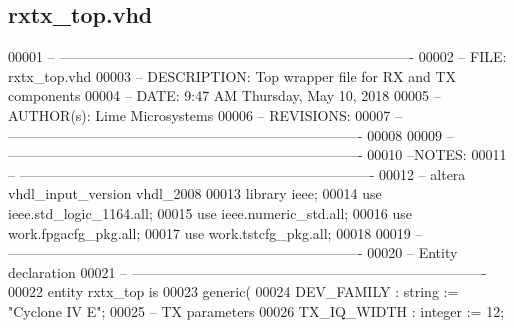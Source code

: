 \subsection{rxtx\+\_\+top.\+vhd}
\label{rxtx__top_8vhd_source}

\begin{DoxyCode}
00001 \textcolor{keyword}{-- ----------------------------------------------------------------------------}
00002 \textcolor{keyword}{-- FILE:          rxtx\_top.vhd}
00003 \textcolor{keyword}{-- DESCRIPTION:   Top wrapper file for RX and TX components}
00004 \textcolor{keyword}{-- DATE:          9:47 AM Thursday, May 10, 2018}
00005 \textcolor{keyword}{-- AUTHOR(s):     Lime Microsystems}
00006 \textcolor{keyword}{-- REVISIONS:}
00007 \textcolor{keyword}{-- ----------------------------------------------------------------------------}
00008 
00009 \textcolor{keyword}{-- ----------------------------------------------------------------------------}
00010 \textcolor{keyword}{--NOTES:}
00011 \textcolor{keyword}{-- ----------------------------------------------------------------------------}
00012 \textcolor{keyword}{-- altera vhdl\_input\_version vhdl\_2008}
00013 \textcolor{vhdlkeyword}{library }\textcolor{keywordflow}{ieee};
00014 \textcolor{vhdlkeyword}{use }ieee.std\_logic\_1164.\textcolor{keywordflow}{all};
00015 \textcolor{vhdlkeyword}{use }ieee.numeric\_std.\textcolor{keywordflow}{all};
00016 \textcolor{vhdlkeyword}{use }work.fpgacfg_pkg.\textcolor{keywordflow}{all};
00017 \textcolor{vhdlkeyword}{use }work.tstcfg_pkg.\textcolor{keywordflow}{all};
00018 
00019 \textcolor{keyword}{-- ----------------------------------------------------------------------------}
00020 \textcolor{keyword}{-- Entity declaration}
00021 \textcolor{keyword}{-- ----------------------------------------------------------------------------}
00022 \textcolor{keywordflow}{entity }rxtx_top \textcolor{keywordflow}{is}
00023    \textcolor{keywordflow}{generic}\textcolor{vhdlchar}{(}
00024       \textcolor{vhdlchar}{DEV_FAMILY}              \textcolor{vhdlchar}{:} \textcolor{comment}{string} \textcolor{vhdlchar}{:=} \textcolor{keyword}{"Cyclone IV E"};
00025 \textcolor{keyword}{      -- TX parameters}
00026       \textcolor{vhdlchar}{TX_IQ_WIDTH}             \textcolor{vhdlchar}{:} \textcolor{comment}{integer} \textcolor{vhdlchar}{:=} \textcolor{vhdllogic}{}\textcolor{vhdllogic}{12};

\end{DoxyCode}
